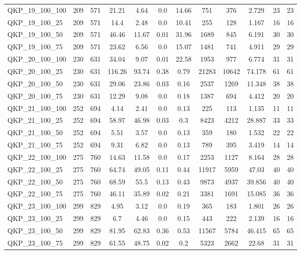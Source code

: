 \begin{table}[!h]
{\begin{tabular}{lccccccccccc}
QKP\_19\_100\_100 & 209 & 571 & 21.21 & 4.64 & 0.0 & 14.66 & 751 & 376 & 2.729 & 23 & 23\\
QKP\_19\_100\_25 & 209 & 571 & 14.4 & 2.48 & 0.0 & 10.41 & 255 & 128 & 1.167 & 16 & 16\\
QKP\_19\_100\_50 & 209 & 571 & 46.46 & 11.67 & 0.01 & 31.96 & 1689 & 845 & 6.191 & 30 & 30\\
QKP\_19\_100\_75 & 209 & 571 & 23.62 & 6.56 & 0.0 & 15.07 & 1481 & 741 & 4.911 & 29 & 29\\
QKP\_20\_100\_100 & 230 & 631 & 34.04 & 9.07 & 0.01 & 22.58 & 1953 & 977 & 6.774 & 31 & 31\\
QKP\_20\_100\_25 & 230 & 631 & 116.26 & 93.74 & 0.38 & 0.79 & 21283 & 10642 & 74.178 & 61 & 61\\
QKP\_20\_100\_50 & 230 & 631 & 29.06 & 23.86 & 0.03 & 0.16 & 2537 & 1269 & 11.348 & 38 & 38\\
QKP\_20\_100\_75 & 230 & 631 & 12.29 & 9.08 & 0.0 & 0.18 & 1387 & 694 & 4.412 & 20 & 20\\
QKP\_21\_100\_100 & 252 & 694 & 4.14 & 2.41 & 0.0 & 0.13 & 225 & 113 & 1.135 & 11 & 11\\
QKP\_21\_100\_25 & 252 & 694 & 58.97 & 46.98 & 0.03 & 0.3 & 8423 & 4212 & 28.887 & 33 & 33\\
QKP\_21\_100\_50 & 252 & 694 & 5.51 & 3.57 & 0.0 & 0.13 & 359 & 180 & 1.532 & 22 & 22\\
QKP\_21\_100\_75 & 252 & 694 & 9.31 & 6.82 & 0.0 & 0.13 & 789 & 395 & 3.419 & 14 & 14\\
QKP\_22\_100\_100 & 275 & 760 & 14.63 & 11.58 & 0.0 & 0.17 & 2253 & 1127 & 8.164 & 28 & 28\\
QKP\_22\_100\_25 & 275 & 760 & 64.74 & 49.05 & 0.11 & 0.44 & 11917 & 5959 & 47.03 & 40 & 40\\
QKP\_22\_100\_50 & 275 & 760 & 68.59 & 55.5 & 0.13 & 0.43 & 9873 & 4937 & 39.856 & 40 & 40\\
QKP\_22\_100\_75 & 275 & 760 & 46.11 & 35.89 & 0.02 & 0.21 & 3381 & 1691 & 15.085 & 36 & 36\\
QKP\_23\_100\_100 & 299 & 829 & 4.95 & 3.12 & 0.0 & 0.19 & 365 & 183 & 1.801 & 26 & 26\\
QKP\_23\_100\_25 & 299 & 829 & 6.7 & 4.46 & 0.0 & 0.15 & 443 & 222 & 2.139 & 16 & 16\\
QKP\_23\_100\_50 & 299 & 829 & 81.95 & 62.83 & 0.36 & 0.53 & 11567 & 5784 & 46.415 & 65 & 65\\
QKP\_23\_100\_75 & 299 & 829 & 61.55 & 48.75 & 0.02 & 0.2 & 5323 & 2662 & 22.68 & 31 & 31\\

\end{tabular}}
\end{table}
